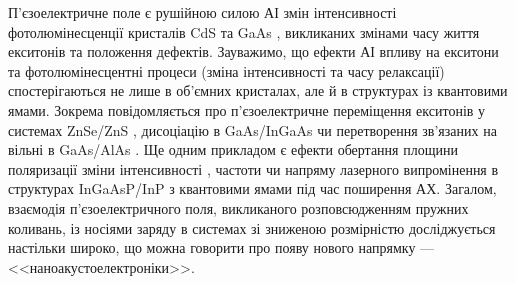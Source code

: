 П'єзоелектричне поле є  рушійною силою АІ змін інтенсивності фотолюмінесценції кристалів CdS \cite{KOROTCHENKOV1998,KorotchenAPL1998} та GaAs \cite{Zhuravlev}, викликаних змінами часу життя екситонів та положення дефектів.
Зауважимо, що ефекти АІ впливу на екситони та фотолюмінесцентні процеси (зміна інтенсивності та часу релаксації) спостерігаються не лише в об'ємних кристалах, але й в структурах із квантовими ямами.
Зокрема повідомляється про п'єзоелектричне переміщення екситонів у системах ZnSe/ZnS \cite{KorotAPL1999,Ostrovskii2001},
дисоціацію в GaAs/InGaAs \cite{PhysRevLett78} чи перетворення зв'язаних на вільні в GaAs/AlAs \cite{PhysRevB80:165307}.
Ще одним прикладом є ефекти
обертання площини поляризації \cite{Kulakova:2012SSC,KulakFTP2013}
зміни інтенсивності \cite{Kulakova:09,KulacFTT2009,KulakJETF2007}, частоти \cite{KulakPJETF} чи напряму \cite{KulakPJTF2010} лазерного випромінення в структурах InGaAsP/InP з квантовими ямами під час поширення АХ.
Загалом, взаємодія п'єзоелектричного поля, викликаного розповсюдженням  пружних коливань, із носіями заряду в системах зі зниженою розмірністю досліджується настільки широко, що можна говорити про появу нового напрямку --- <<наноакустоелектроніки>>.





